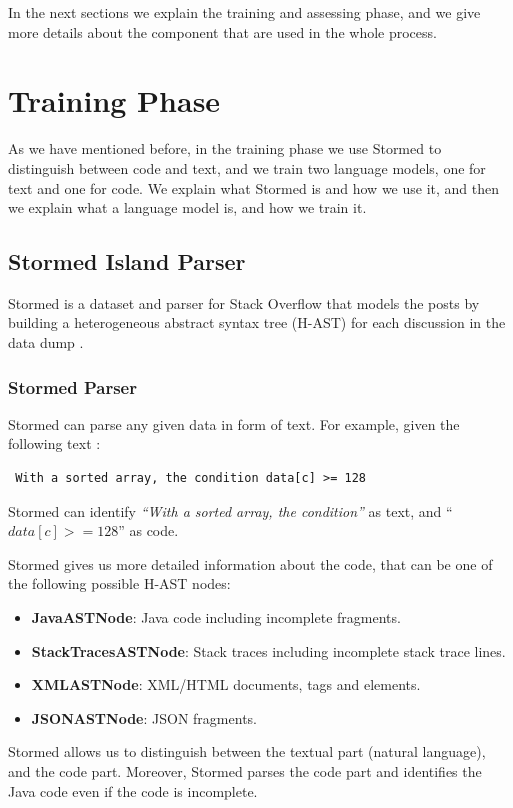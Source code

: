 \documentclass[12pt,mscthesis]{usiinfthesis}
\begin{document}
	In the next sections we explain the training and assessing phase, and we give more details about the component that are used in the whole process.

	\section{Training Phase}

	As we have mentioned before, in the training phase we use Stormed to distinguish between code and text, and we train two language models, one for text and one for code. We explain what Stormed is and how we use it, and then we explain what a language model is, and how we train it.

	\subsection{Stormed Island Parser}
	
	 Stormed is a dataset and parser for Stack Overflow that models the posts by building a heterogeneous abstract syntax tree (H-AST) for each discussion in the data dump \cite{Ponz2015a}.
	 \subsubsection{Stormed Parser}
	 Stormed can parse any given data in form of text. For example, given the following text : 
	 \begin{verbatim} With a sorted array, the condition data[c] >= 128  \end{verbatim} 
	 Stormed can identify  \emph{``With a sorted array, the condition''} as text, and ``$data[c] >= 128$'' as code. 


	 Stormed gives us more detailed information about the code, that can be one of the following possible H-AST nodes:
	 \begin{itemize}
	 \item \textbf{JavaASTNode}: Java code including incomplete fragments.
	 \item \textbf{StackTracesASTNode}: Stack traces including incomplete stack trace lines.
	 \item \textbf{XMLASTNode}: XML/HTML documents, tags and elements.
	 \item \textbf{JSONASTNode}: JSON fragments.
	 \end{itemize}

	 Stormed allows us to distinguish between the textual part (natural language), and the code part. Moreover, Stormed parses the code part and identifies the Java code even if the code is incomplete.
\end{document}
